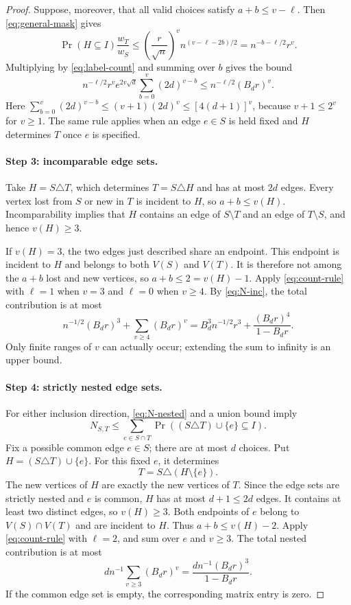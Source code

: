 \documentclass[11pt]{article}
\newcommand{\1}{\mathbf 1}
\theoremstyle{definition}
\theoremstyle{remark}
\numberwithin{equation}{section}
\begin{document}
\begin{proof}
Suppose, moreover, that all valid choices satisfy $a+b\le v-\ell$. Then \eqref{eq:general-mask} gives
\[
 \Pr(H\subseteq I)\frac{w_T}{w_S}
 \le\left(\frac r{\sqrt n}\right)^v
       n^{(v-\ell-2b)/2}
 =n^{-b-\ell/2}r^v.
\]
Multiplying by \eqref{eq:label-count} and summing over $b$ gives the bound
\begin{equation}\label{eq:count-rule}
 n^{-\ell/2}r^ve^{2v\sqrt d}
       \sum_{b=0}^{v}(2d)^{v-b}
 \le n^{-\ell/2}(B_dr)^v.
\end{equation}
Here $\sum_{b=0}^v(2d)^{v-b}\le(v+1)(2d)^v\le[4(d+1)]^v$, because $v+1\le2^v$ for $v\ge1$. The same rule applies when an edge $e\in S$ is held fixed and $H$ determines $T$ once $e$ is specified.

\paragraph{Step 3: incomparable edge sets.}
Take $H=S\triangle T$, which determines $T=S\triangle H$ and has at most $2d$ edges. Every vertex lost from $S$ or new in $T$ is incident to $H$, so $a+b\le v(H)$. Incomparability implies that $H$ contains an edge of $S\setminus T$ and an edge of $T\setminus S$, and hence $v(H)\ge3$.

If $v(H)=3$, the two edges just described share an endpoint. This endpoint is incident to $H$ and belongs to both $V(S)$ and $V(T)$. It is therefore not among the $a+b$ lost and new vertices, so $a+b\le2=v(H)-1$. Apply \eqref{eq:count-rule} with $\ell=1$ when $v=3$ and $\ell=0$ when $v\ge4$. By \eqref{eq:N-inc}, the total contribution is at most
\begin{equation}\label{eq:inc-row}
 n^{-1/2}(B_dr)^3+\sum_{v\ge4}(B_dr)^v
 =B_d^3n^{-1/2}r^3+\frac{(B_dr)^4}{1-B_dr}.
\end{equation}
Only finite ranges of $v$ can actually occur; extending the sum to infinity is an upper bound.

\paragraph{Step 4: strictly nested edge sets.}
For either inclusion direction, \eqref{eq:N-nested} and a union bound imply
\[
 N_{S,T}\le\sum_{e\in S\cap T}
       \Pr((S\triangle T)\cup\{e\}\subseteq I).
\]
Fix a possible common edge $e\in S$; there are at most $d$ choices. Put $H=(S\triangle T)\cup\{e\}$. For this fixed $e$, it determines
\[
 T=S\triangle(H\setminus\{e\}).
\]
The new vertices of $H$ are exactly the new vertices of $T$. Since the edge sets are strictly nested and $e$ is common, $H$ has at most $d+1\le2d$ edges. It contains at least two distinct edges, so $v(H)\ge3$. Both endpoints of $e$ belong to $V(S)\cap V(T)$ and are incident to $H$. Thus $a+b\le v(H)-2$. Apply \eqref{eq:count-rule} with $\ell=2$, and sum over $e$ and $v\ge3$. The total nested contribution is at most
\begin{equation}\label{eq:nested-row}
 dn^{-1}\sum_{v\ge3}(B_dr)^v
 =\frac{dn^{-1}(B_dr)^3}{1-B_dr}.
\end{equation}
If the common edge set is empty, the corresponding matrix entry is zero.


\end{proof}
\end{document}
